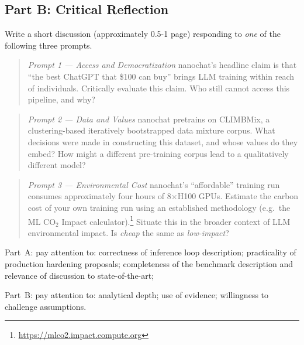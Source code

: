 \subsection{Part B: Critical Reflection}

Write a short discussion (approximately 0.5-1 page) responding to {\em one} of the following three prompts. %

\begin{quote}
{\em Prompt 1 --- Access and Democratization}
nanochat's headline claim is that ``the best ChatGPT that \$100 can buy'' brings LLM training within reach of individuals. Critically evaluate this claim. Who still cannot access this pipeline, and why?
\end{quote}

\begin{quote}
{\em Prompt 2 --- Data and Values}
nanochat pretrains on CLIMBMix, a clustering-based iteratively bootstrapped data mixture corpus. What decisions were made in constructing this dataset, and whose values do they embed?  How might a different pre-training corpus lead to a qualitatively different model?
\end{quote}

\begin{quote}
{\em Prompt 3 --- Environmental Cost}
nanochat's ``affordable'' training run consumes approximately four hours of 8$\times$H100 GPUs. Estimate the carbon cost of your own training run using an established methodology (e.g.\ the ML CO$_2$ Impact calculator).\footnote{\url{https://mlco2.impact.compute.org}} Situate this in the broader context of LLM environmental impact.  Is {\em cheap} the same as {\em low-impact}?
\end{quote}


Part~A: pay attention to: correctness of inference loop description; practicality of production hardening proposals; completeness of the benchmark description and relevance of discussion to state-of-the-art; 

Part~B: pay attention to: analytical depth; use of evidence; willingness to challenge assumptions.




